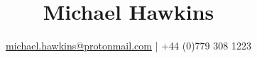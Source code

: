 \documentclass[a4paper]{article}
\title{Michael Hawkins}
\author{\href{mailto:michael.hawkins@protonmail.com}{michael.hawkins@protonmail.com} | +44 (0)779 308 1223}
\begin{document}
%
\maketitle
%


\vspace{12pt}

\noindent
\begin{minipage}[t]{0.3\textwidth}
  
\end{minipage}%
\hfill
\begin{minipage}[t]{0.6\textwidth}
  
\end{minipage}

\vspace{12pt}

\noindent
\begin{minipage}[t]{0.3\textwidth}
  
\end{minipage}%
\hfill
\begin{minipage}[t]{0.6\textwidth}
  
\end{minipage}
\end{document}
